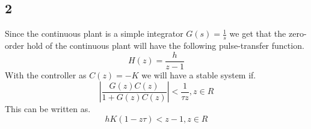 \documentclass[10pt,a4paper]{article}
\begin{document}
\subsection*{2}
Since the continuous plant is a simple integrator $G(s)=\frac{1}{s}$ we get that the zero-order hold of the continuous plant will have the following pulse-transfer function.
\begin{equation*}
H(z)=\frac{h}{z-1}
\end{equation*}
With the controller as $C(z)=-K$ we will have a stable system if.
\begin{equation*}
|\frac{G(z)C(z)}{1+G(z)C(z)}|<\frac{1}{\tau z},	z\in R
\end{equation*}
This can be written as.
\begin{equation*}
hK(1-z\tau)<z-1,	z\in R
\end{equation*}
\end{document}

